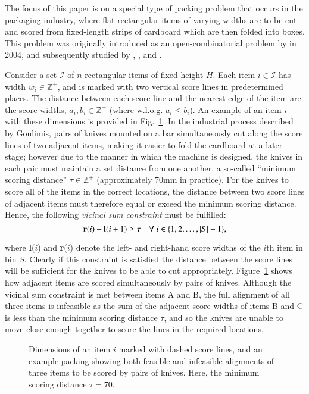 \documentclass[authoryear]{elsarticle}
\begin{document}
The focus of this paper is on a special type of packing problem that occurs in the packaging industry, where flat rectangular items of varying widths are to be cut and scored from fixed-length strips of cardboard which are then folded into boxes. This problem was originally introduced as an open-combinatorial problem by \citeauthor{goulimis2004} in 2004, and subsequently studied by \citet{lewis2011}, \citet{becker2015}, and \citet{hawa2018}.

Consider a set $\mathcal{I}$ of $n$ rectangular items of fixed height $H$. Each item $i \in \mathcal{I}$ has width $w_i \in \mathbb{Z}^+$, and is marked with two vertical score lines in predetermined places. The distance between each score line and the nearest edge of the item are the score widths, $a_i, b_i \in \mathbb{Z}^+$ (where w.l.o.g. $a_i \leq b_i$). An example of an item $i$ with these dimensions is provided in Fig.~\ref{fig:itemsdimknives}. In the industrial process described by Goulimis, pairs of knives mounted on a bar simultaneously cut along the score lines of two adjacent items, making it easier to fold the cardboard at a later stage; however due to the manner in which the machine is designed, the knives in each pair must maintain a set distance from one another, a so-called ``minimum scoring distance'' $\tau \in \mathbb{Z}^+$ (approximately 70mm in practice). For the knives to score all of the items in the correct locations, the distance between two score lines of adjacent items must therefore equal or exceed the minimum scoring distance. Hence, the following \emph{vicinal sum constraint} must be fulfilled:
\begin{equation}
	\textbf{r}(i) + \textbf{l}(i+1) \geq \tau \quad \forall \hspace{1mm} i \in \{1,2,\dotsc,|S|- 1\},
	\label{eqn:vsc}
\end{equation}

\noindent where \textbf{l}($i$) and \textbf{r}($i$) denote the left- and right-hand score widths of the $i$th item in bin $S$. Clearly if this constraint is satisfied the distance between the score lines will be sufficient for the knives to be able to cut appropriately. Figure~\ref{fig:itemsdimknives} shows how adjacent items are scored simultaneously by pairs of knives. Although the vicinal sum constraint is met between items A and B, the full alignment of all three items is infeasible as the sum of the adjacent score widths of items B and C is less than the minimum scoring distance $\tau$, and so the knives are unable to move close enough together to score the lines in the required locations.
\begin{figure}[H]	
	\centering
	
	\caption{Dimensions of an item $i$ marked with dashed score lines, and an example packing showing both feasible and infeasible alignments of three items to be scored by pairs of knives. Here, the minimum scoring distance $\tau = 70$.}	
	\label{fig:itemsdimknives}
\end{figure}
\end{document}
